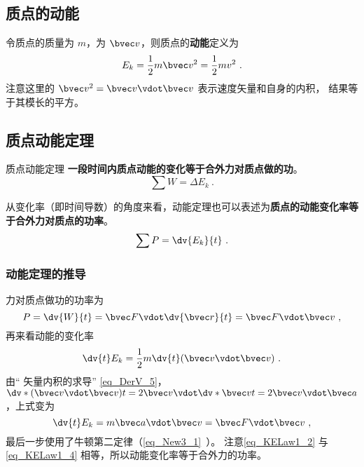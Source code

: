 
\subsection{质点的动能}
令质点的质量为 $m$，为 $\bvec v$，则质点的\textbf{动能}定义为
\begin{equation}
E_k = \frac12 m\bvec v^2 = \frac12 mv^2~.
\end{equation}
注意这里的 $\bvec v^2 = \bvec v \vdot \bvec v$ 表示速度矢量和自身的内积， 结果等于其模长的平方。

\subsection{质点动能定理}
\begin{theorem}{质点动能定理}
\textbf{一段时间内质点动能的变化等于合外力对质点做的功}。
\begin{equation}
\sum W=\Delta E_k~.
\end{equation}

从变化率（即时间导数）的角度来看，动能定理也可以表述为\textbf{质点的动能变化率等于合外力对质点的功率}。
\begin{equation}
\sum P=\dv{E_k}{t}~.
\end{equation}
\end{theorem}

\subsubsection{动能定理的推导}
力对质点做功的功率为
\begin{equation}\label{eq_KELaw1_2}
P = \dv{W}{t} =  \bvec F\vdot \dv{\bvec r}{t} = \bvec F\vdot\bvec v~,
\end{equation}
再来看动能的变化率
\begin{equation}
\dv{t} E_k = \frac12 m\dv{t} (\bvec v\vdot\bvec v)~.
\end{equation}
由“ 矢量内积的求导” \autoref{eq_DerV_5}，$\dv*{(\bvec v\vdot\bvec v)}{t} = 2\bvec v\vdot \dv*{\bvec v}{t} = 2\bvec v\vdot\bvec a$，上式变为
\begin{equation}\label{eq_KELaw1_4}
\dv{t} E_k = m\bvec a\vdot\bvec v = \bvec F\vdot\bvec v~,
\end{equation}
最后一步使用了牛顿第二定律（\autoref{eq_New3_1}~）。 注意\autoref{eq_KELaw1_2} 与\autoref{eq_KELaw1_4} 相等，所以动能变化率等于合外力的功率。
